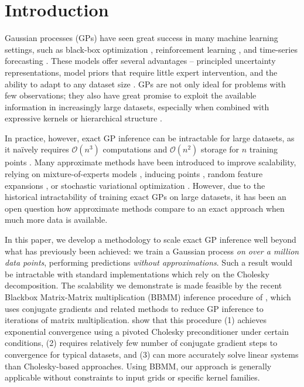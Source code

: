 \section{Introduction}
Gaussian processes (GPs) have seen great success in many machine learning settings, such as black-box optimization \citep{snoek2012practical}, reinforcement learning \cite{deisenroth2011pilco,deisenroth2015gaussian}, and time-series forecasting \cite{roberts2013gaussian}.
These models offer several advantages -- principled uncertainty representations, model priors that require little expert intervention, and the ability to adapt to any dataset size \citep{rasmussen2001occam,rasmussen2006gaussian}.
GPs are not only ideal for problems with few observations; they also have great
promise to exploit the available information in increasingly large datasets,
especially when combined with expressive kernels \cite{wilson2013gaussian} or
hierarchical structure \cite{wilson2012gaussian, damianou2013deep,wilson2016deep,salimbeni2017doubly}.

In practice, however, exact GP inference can be intractable for large datasets, as it na\"ively requires $\mathcal{O}(n^3)$ computations and $\mathcal{O}(n^2)$ storage for $n$ training points \cite{rasmussen2006gaussian}.
Many approximate methods have been introduced to improve scalability, relying on mixture-of-experts models \cite{deisenroth2015distributed}, inducing points \citep{snelson2006sparse,titsias2009variational,wilson2015kernel,gardner2018product},
random feature expansions \cite{rahimi2008random,le2013fastfood,yang2015carte},
or stochastic variational optimization \citep{hensman2013gaussian,hensman2015scalable,wilson2016stochastic,cheng2017variational,salimbeni2018orthogonally}.
However, due to the historical intractability of training exact GPs on large datasets, it
has been an open question how approximate methods compare to an exact approach when much more data is available.

In this paper, we develop a methodology to scale exact GP inference well beyond what has previously been achieved:
we train a Gaussian process \emph{on over a million data points}, performing predictions \emph{without approximations}.
Such a result would be intractable with standard implementations which rely on the Cholesky decomposition.
The scalability we demonstrate is made feasible by the recent Blackbox Matrix-Matrix multiplication (BBMM) inference procedure of \citet{gardner2018gpytorch}, which uses conjugate gradients and related methods to reduce GP inference to iterations of matrix multiplication. 
\citet{gardner2018gpytorch} show that this procedure (1) achieves exponential convergence using a pivoted Cholesky preconditioner under certain conditions, (2) requires relatively few number of conjugate gradient steps to convergence for typical datasets, and (3) can more accurately solve linear systems than Cholesky-based approaches. Using BBMM, our approach is generally applicable without constraints to input grids or specific kernel families. 

